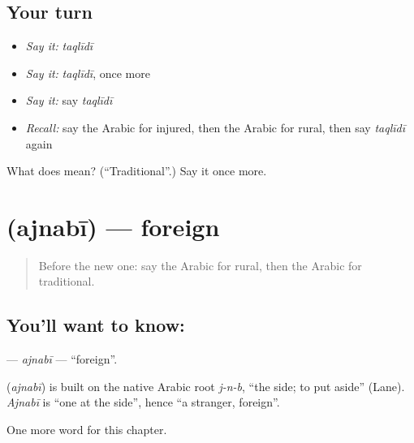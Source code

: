 \subsection*{Your turn}
\begin{itemize}
\raggedright
  \item \emph{Say it:} \emph{taqlīdī}
  \item \emph{Say it:} \emph{taqlīdī}, once more
  \item \emph{Say it:} say \emph{taqlīdī}
  \item \emph{Recall:} say the Arabic for injured, then the Arabic for rural, then say \emph{taqlīdī} again
\end{itemize}

\begin{tcolorbox}[breakable,colback=teal!4,colframe=teal!35!black,title={Before you move on}]
What does  mean? (\textquotedblleft{}Traditional\textquotedblright{}.) Say it once more.
\end{tcolorbox}
\section[\texorpdfstring{\ar{أجنبي} (ajnabī)}{أجنبي (ajnabī)}]{ (ajnabī) — foreign}

\label{lesson:AR-C180-ajnabi}



\begin{quote}
Before the new one: say the Arabic for rural, then the Arabic for traditional.
\end{quote}

\subsection*{You'll want to know: }
\textbf{} — \emph{ajnabī} — \textquotedblleft{}foreign\textquotedblright{}.

\begin{cousinweb}
\textbf{} (\emph{ajnabī}) is built on the native Arabic root \emph{j-n-b}, \textquotedblleft{}the side; to put aside\textquotedblright{} (Lane). \emph{Ajnabī} is \textquotedblleft{}one at the side\textquotedblright{}, hence \textquotedblleft{}a stranger, foreign\textquotedblright{}.
\end{cousinweb}

\begin{grammarlens}[title={What you've built}]
One more word for this chapter.
\end{grammarlens}

